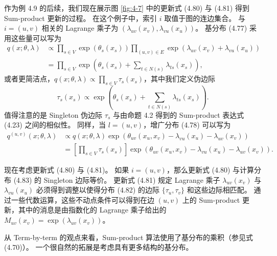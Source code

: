 \begin{tcolorbox}
\begin{exam}
    作为例 4.9 的后续，我们现在展示图 \ref{fig:4-7} 中的更新式 (4.80) 与 (4.81) 得到 Sum-product 更新的过程。
    在这个例子中，索引 $i$ 取值于图的连边集合。
    与 $i = (u, v)$ 相关的 Lagrange 乘子为 $(\lambda_{uv}(x_v), \lambda_{vu}(x_u))$。
    基分布 (4.77) 采用这些量可以写为
    \begin{align}
        q(x; \theta, \lambda) &\propto \prod_{s \in V}\exp(\theta_s(x_s))\prod_{(u, v) \in E}\exp(\lambda_{uv}(x_v)+\lambda_{vu}(x_u)) \nonumber \\
        &= \prod_{s \in V}\exp(\theta_s(x_s) + \sum_{t \in N(s)}\lambda_{ts}(x_s)), 
    \end{align}
    或者更简洁点，$q(x; \theta, \lambda) \propto \prod_{s \in V}\tau_s(x_s)$，其中我们定义伪边际
    \begin{equation*}
        \tau_s(x_s) \propto \exp(\theta_s(x_s)+\sum_{t \in N(s)}\lambda_{ts}(x_s)).
    \end{equation*}
    值得注意的是 Singleton 伪边际 $\tau_s$ 与由命题 4.2 得到的 Sum-product 表达式 (4.23) 之间的相似性。
    同样，当 $l = (u, v)$，增广分布 (4.78) 可以写为
    \begin{align}
        q^{(u, v)}(x; \theta, \lambda) &\propto q(x; \theta, \lambda)\exp(\theta_{uv}(x_u, x_v) - \lambda_{vu}(x_u) - \lambda_{uv}(x_v)) \nonumber \\
        &= [\prod_{s \in V}\tau_s(x_s)]\exp(\theta_{uv}(x_u, x_v)-\lambda_{vu}(x_u)-\lambda_{uv}(x_v)).
    \end{align}

    现在考虑更新式 (4.80) 与 (4.81)。
    如果 $i = (u, v)$，那么更新式 (4.80) 与计算分布 (4.83) 的 Singleton 边际等价。
    更新式 (4.81) 规定 Lagrange 乘子 $\lambda_{uv}(x_v)$ 与 $\lambda_{vu}(x_u)$ 必须得到调整以使得分布 (4.82) 的边际 $\{\tau_u, \tau_v\}$ 和这些边际相匹配。
    通过一些代数运算，这些不动点条件可以得到在边 $(u, v)$ 上的 Sum-product 更新，其中的消息是由指数化的 Lagrange 乘子给出的 $M_{uv}(x_v) = \exp(\lambda_{uv}(x_v))$。
\end{exam}
\end{tcolorbox}

从 Term-by-term 的观点来看，Sum-product 算法使用了基分布的乘积（参见式 (4.70)）。
一个很自然的拓展是考虑具有更多结构的基分布。

